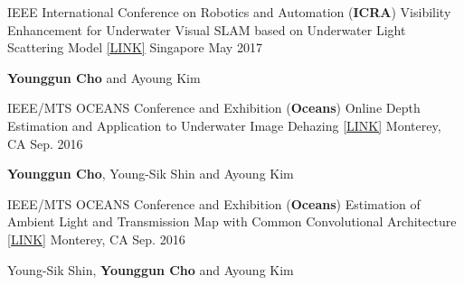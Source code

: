 \begin{cventries}
  \cventry
    {IEEE International Conference on Robotics and Automation (\textbf{ICRA})} %
    {Visibility Enhancement for Underwater Visual SLAM based on Underwater Light Scattering Model \href{http://irap.kaist.ac.kr/publications/ycho-2017-icra.pdf}{[LINK]}} %
    {Singapore} %
    {May 2017} %
    {
      \begin{cvitems} %
        \item {\textbf{Younggun Cho} and Ayoung Kim}
      \end{cvitems}
    }

  \cventry
    {IEEE/MTS OCEANS Conference and Exhibition (\textbf{Oceans})} %
    {Online Depth Estimation and Application to Underwater Image Dehazing \href{http://irap.kaist.ac.kr/publications/ycho-2016-oceans.pdf}{[LINK]}} %
    {Monterey, CA} %
    {Sep. 2016} %
    {
      \begin{cvitems} %
        \item {\textbf{Younggun Cho}, Young-Sik Shin and Ayoung Kim}
      \end{cvitems}
    }

  \cventry
    {IEEE/MTS OCEANS Conference and Exhibition (\textbf{Oceans})} %
    {Estimation of Ambient Light and Transmission Map with Common Convolutional Architecture \href{http://irap.kaist.ac.kr/publications/yshin-2016-oceans.pdf}{[LINK]}} %
    {Monterey, CA} %
    {Sep. 2016} %
    {
      \begin{cvitems} %
        \item {Young-Sik Shin, \textbf{Younggun Cho} and Ayoung Kim}
      \end{cvitems}
    }
\newline
\newline
\end{cventries}



